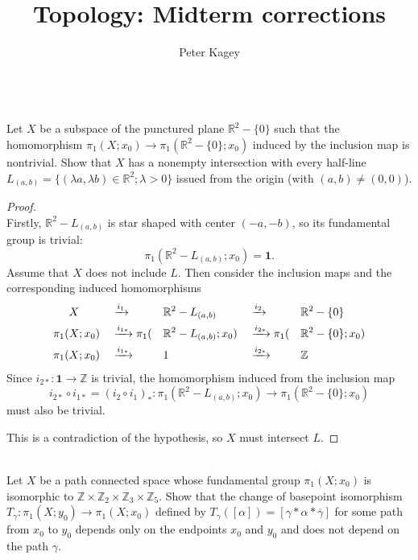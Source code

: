 \documentclass{article}
\newenvironment{problem}[2][Problem]{\begin{trivlist}
\item[\hskip \labelsep {\bfseries #1}\hskip \labelsep {\bfseries #2.}]}{\end{trivlist}}
\begin{document}
\title{Topology: Midterm corrections}
\author{Peter Kagey}

\maketitle

\begin{problem}{1} \text{} \\
  Let $X$ be a subspace of the punctured plane $\mathbb R^2 - \{ 0 \}$ such that
  the homomorphism $\pi_1(X; x_0) \rightarrow \pi_1(\mathbb R^2 - \{ 0 \}; x_0)$
  induced by the inclusion map is
  nontrivial. Show that $X$ has a nonempty intersection with every half-line
  $L_{(a, b)} = \{ (\lambda a, \lambda b) \in \mathbb R^2; \lambda > 0\}$ issued
  from the origin (with $(a, b) \neq (0, 0)$).
\end{problem}

\begin{proof} \text{} \\
  Firstly, $\mathbb R^2 - L_{(a,b)}$ is star shaped with center $(-a, -b)$,
  so its fundamental group is trivial: \[
    \pi_1(\mathbb R^2 - L_{(a,b)}; x_0) = \mathbf{1}.
  \]
  Assume that $X$ does not include $L$. Then consider the inclusion maps and the corresponding induced homomorphisms
  \begin{alignat*}{5}
    &X
    &&\xrightarrow{i_1} &&\mathbb R^2 - L_{(a,b)}
    &&\xrightarrow{i_2} &&\mathbb R^2 - \{ 0 \} \\
    \pi_1(&X; x_0)
    &&\xrightarrow{i_{1*}} \pi_1(&&\mathbb R^2 - L_{(a,b)}; x_0)
    &&\xrightarrow{i_{2*}} \pi_1(&&\mathbb R^2 - \{ 0 \}; x_0)\\
    \pi_1(&X; x_0)
    &&\xrightarrow{i_{1*}} &&\mathbb \mathbf{1}
    &&\xrightarrow{i_{2*}} &&\mathbb Z
  \end{alignat*}
  Since $i_{2*}\colon \mathbf{1}\rightarrow\mathbb Z$ is trivial, the
  homomorphism induced from the inclusion map
  \[
    i_{2*} \circ i_{1*} = (i_{2} \circ i_{1})_*\colon\pi_1(\mathbb R^2 - L_{(a,b)}; x_0) \rightarrow\pi_1(\mathbb R^2 - \{ 0 \}; x_0)
  \]
  must also be trivial.

  This is a contradiction of the hypothesis, so $X$ must intersect $L$.
\end{proof}
\pagebreak
\begin{problem}{2} \text{} \\
  Let $X$ be a path connected space whose fundamental group $\pi_1(X; x_0)$ is
  isomorphic to $\mathbb Z \times \mathbb Z_2 \times \mathbb Z_3 \times \mathbb Z_5$.
  Show that the change of basepoint isomorphism
  $T_\gamma\colon\pi_1(X;y_0) \rightarrow \pi_1(X;x_0)$ defined by
  $T_\gamma([\alpha]) = [\gamma * \alpha * \overline\gamma]$ for some path from
  $x_0$ to $y_0$ depends only on the endpoints $x_0$ and $y_0$ and does not
  depend on the path $\gamma$.
\end{problem}
\end{document}

